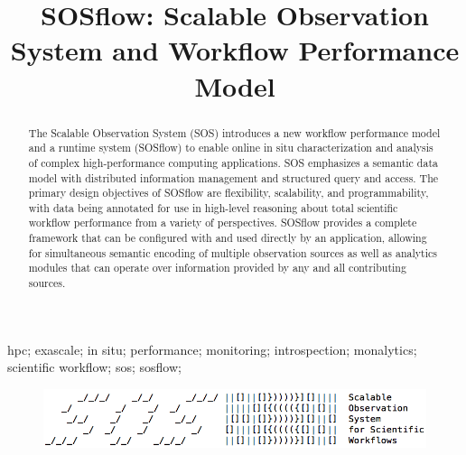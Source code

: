 
\title{SOSflow: Scalable Observation System and Workflow Performance Model}

\author{
	 
 }

\maketitle


\begin{abstract}
The Scalable Observation System (SOS) introduces a new workflow
performance model and a runtime system (SOSflow) to enable online in
situ characterization and analysis of complex high-performance
computing applications.
%
SOS emphasizes a semantic data model with distributed information
management and structured query and access.
%
The primary design objectives of SOSflow are flexibility, scalability,
and programmability, with data being annotated for use in high-level
reasoning about total scientific workflow performance from a variety
of perspectives.
%
SOSflow provides a complete framework that can be configured with and
used directly by an application, allowing for simultaneous semantic
encoding of multiple observation sources as well as analytics modules
that can operate over information provided by any and all contributing
sources.
\end{abstract}


\begin{IEEEkeywords}
hpc; exascale; in situ; performance; monitoring; introspection;
monalytics; scientific workflow; sos; sosflow;
\end{IEEEkeywords}


\IEEEpeerreviewmaketitle


\begin{figure}[!t]
\centering
\includegraphics[width=5in]{images/sosflow_masthead.png}
\label{fig_sim}
\end{figure}



